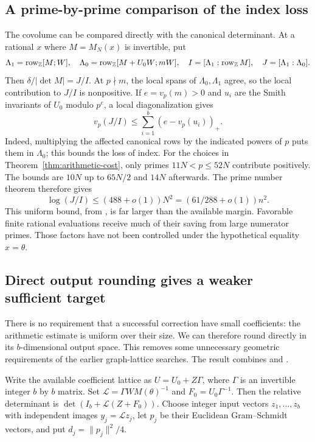 \subsection{A prime-by-prime comparison of the index loss}

The covolume can be compared directly with the canonical determinant.
At a rational $x$ where $M=M_N(x)$ is invertible, put
\[
 \Lambda_1=\operatorname{row}_{\mathbb Z}[M;W],\quad
 \Lambda_0=\operatorname{row}_{\mathbb Z}[M+U_0W;mW],\quad
 I=[\Lambda_1:\operatorname{row}_{\mathbb Z}M],\quad
 J=[\Lambda_1:\Lambda_0].
\]
Then $\delta/|\det M|=J/I$. At $p\nmid m$, the local spans of
$\Lambda_0,\Lambda_1$ agree, so the local contribution to $J/I$ is
nonpositive. If $e=v_p(m)>0$ and $u_i$ are the Smith invariants of
$U_0$ modulo $p^e$, a local diagonalization gives
\[
 v_p(J/I)\le\sum_{i=1}^b(e-v_p(u_i))_+.
\]
Indeed, multiplying the affected canonical rows by the indicated
powers of $p$ puts them in $\Lambda_0$; this bounds the loss of index.
For the choices in Theorem~\ref{thm:arithmetic-cost}, only primes
$11N<p\le52N$ contribute positively. The bounds are $10N$ up to
$65N/2$ and $14N$ afterwards. The prime number theorem therefore gives
\[
 \log(J/I)\le(488+o(1))N^2=(61/288+o(1))n^2.
\]
This uniform bound, from , is far larger than the available
margin. Favorable finite rational evaluations receive much of their
saving from large numerator primes. Those factors have not been
controlled under the hypothetical equality $x=\theta$.

\subsection{Direct output rounding gives a weaker sufficient target}

There is no requirement that a successful correction have small
coefficients: the arithmetic estimate is uniform over their size.
We can therefore round directly in its $b$-dimensional output space.
This removes some unnecessary geometric requirements of the earlier
graph-lattice searches. The result combines  and .

Write the available coefficient lattice as $U=U_0+Z\Gamma$,
where $\Gamma$ is an invertible integer $b$ by $b$ matrix. Set
$\mathcal L=\Gamma WM(\theta)^{-1}$ and $F_0=U_0\Gamma^{-1}$.
Then the relative determinant is $\det(I_b+\mathcal L(Z+F_0))$.
Choose integer input vectors $z_1,\ldots,z_b$ with independent images
$y_j=\mathcal Lz_j$, let $p_j$ be their Euclidean Gram--Schmidt
vectors, and put $d_j=\|p_j\|^2/4$.

